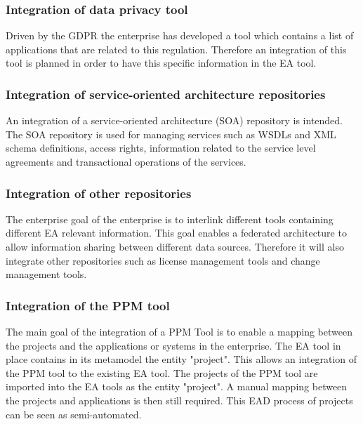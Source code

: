 \subsubsection{Integration of data privacy tool}
Driven by the GDPR the enterprise has developed a tool which contains a list of applications that are related to this regulation. Therefore an integration of this tool is planned in order to have this specific information in the EA tool.

\subsubsection{Integration of service-oriented architecture repositories}

An integration of a service-oriented architecture (SOA) repository is intended.
The SOA repository is used for managing services such as WSDLs and XML schema definitions, access rights, information related to the service level agreements and transactional operations of the services. \cite{Krafzig2005} 

\subsubsection{Integration of other repositories}
The enterprise goal of the enterprise is to interlink different tools containing different EA relevant information. This goal enables a federated architecture to allow information sharing between different data sources. Therefore it will also integrate other repositories such as license management tools and change management tools.

\subsubsection{Integration of the PPM tool}
The main goal of the integration of a PPM Tool is to enable a mapping between the projects and the applications or systems in the enterprise. The EA tool in place contains in its metamodel the entity "project". This allows an integration of the PPM tool to the existing EA tool. The projects of the PPM tool are imported into the EA tools as the entity "project". A manual mapping between the projects and applications is then still required. This EAD process of projects can be seen as semi-automated.

